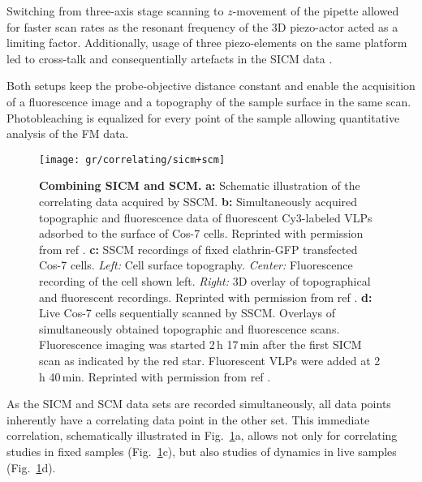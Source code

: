 Switching from three-axis stage scanning to $z$-movement of the pipette
allowed for faster scan rates as the resonant frequency of the 3D
piezo-actor acted as a limiting factor. Additionally, usage of three
piezo-elements on the same platform led to cross-talk and consequentially
artefacts in the SICM data \cite{Shevchuk2013}.



Both setups keep the probe-objective distance constant and enable the
acquisition of a fluorescence image and a topography of the sample surface in
the same scan. Photobleaching is equalized for every point of the sample
allowing quantitative analysis of the FM data.

\begin{figure}
  \texttt{[image: gr/correlating/sicm+scm]}
  \caption{%
    \textbf{Combining SICM and SCM.}
    \textbf{a:} Schematic illustration of the correlating data acquired by SSCM.
    \textbf{b:} Simultaneously acquired topographic and fluorescence data of fluorescent Cy3-labeled 
    VLPs adsorbed to the surface of Cos-7 cells. Reprinted with permission from ref \cite{Gorelik2002a}.
    \textbf{c:} SSCM recordings of fixed clathrin-GFP transfected Cos-7 cells. 
    	\textit{Left:} Cell surface topography. 
    	\textit{Center:} Fluorescence recording of the cell shown left. 
    	\textit{Right:} 3D overlay of topographical and fluorescent recordings. 
    Reprinted with permission from ref \cite{Shevchuk2008}.
    \textbf{d:} Live Cos-7 cells sequentially scanned by SSCM. Overlays of simultaneously obtained 
    topographic and fluorescence scans. Fluorescence imaging was started 2\,h 17\,min after the first 
    SICM scan as indicated by the red star. Fluorescent VLPs were added at 2\,h 40\,min. 
    Reprinted with permission from ref \cite{Gorelik2002}.
  }
  \label{fig:sicm+scm}
\end{figure}

As the SICM and SCM data sets are recorded simultaneously, all data points inherently have a
correlating data point in the other set. This immediate correlation, schematically illustrated in
Fig.~\ref{fig:sicm+scm}a, allows not only for correlating studies in fixed
samples (Fig.~\ref{fig:sicm+scm}c), but also studies of dynamics in live
samples (Fig.~\ref{fig:sicm+scm}d).


